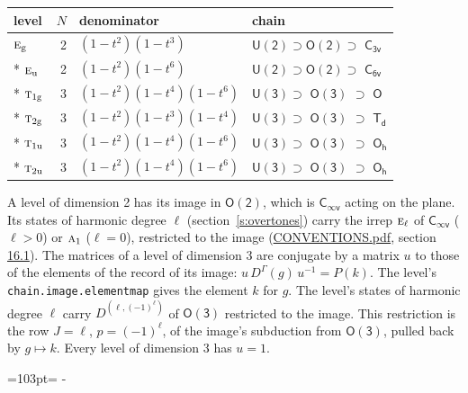 \documentclass[10pt,a4paper]{article}
\makeatletter
\def\grouprule#1#2{\noalign{\marks\LTgroupmarks{\the\belowrulesep}\nobreak\vskip#1%
  \vskip\aboverulesep}\multispan\LT@cols\unskip{\leaders\hrule\@height#2\hfill\kern\z@}\cr
  \noalign{\penalty\LTrulebreak\vskip\belowrulesep\global\@lastruleclass\z@}}
\newcommand{\needspace}[1]{\par\penalty-100\begingroup\dimen0=#1\relax\dimen2=\pagegoal
  \advance\dimen2-\pagetotal\ifdim\dimen0>\dimen2\relax\ifdim\dimen2>0pt\vfil\break\fi\fi
  \endgroup}
\numberwithin{equation}{section}
\newcommand{\grp}[1]{\mathsf{#1}}
\newcommand{\irr}[1]{\text{\normalfont\scshape #1}}
\newcommand{\ptag}[1]{\mathrm{#1}}
\newcommand{\irrJp}[2]{D^{(#1,#2)}}
\newcommand{\repD}[1]{D^{#1}}
\makeatother
\begin{document}
{\small\begin{longtable}{@{}lrll@{}}\toprule
level & $N$ & denominator & chain\\\midrule\endhead
\bottomrule\endfoot\endlastfoot
$\irr{e}_{\ptag{g}}$ & 2 & $(1-t^{2})(1-t^{3})$ & $\grp{U(2)} \supset \grp{O(2)} \supset$ \href{C3v.pdf}{$\grp{C_{3v}}$}\\*
$\irr{e}_{\ptag{u}}$ & 2 & $(1-t^{2})(1-t^{6})$ & $\grp{U(2)} \supset \grp{O(2)} \supset$ \href{C6v.pdf}{$\grp{C_{6v}}$}\\*
\grouprule{0pt}{\lightrulewidth}
$\irr{t}_{1\ptag{g}}$ & 3 & $(1-t^{2})(1-t^{4})(1-t^{6})$ & $\grp{U(3)} \supset$ \href{O3.pdf}{$\grp{O(3)}$} $\supset$ \href{O.pdf}{$\grp{O}$}\\*
$\irr{t}_{2\ptag{g}}$ & 3 & $(1-t^{2})(1-t^{3})(1-t^{4})$ & $\grp{U(3)} \supset$ \href{O3.pdf}{$\grp{O(3)}$} $\supset$ \href{Td.pdf}{$\grp{T_{d}}$}\\*
$\irr{t}_{1\ptag{u}}$ & 3 & $(1-t^{2})(1-t^{4})(1-t^{6})$ & $\grp{U(3)} \supset$ \href{O3.pdf}{$\grp{O(3)}$} $\supset$ \href{Oh.pdf}{$\grp{O_{h}}$}\\*
$\irr{t}_{2\ptag{u}}$ & 3 & $(1-t^{2})(1-t^{4})(1-t^{6})$ & $\grp{U(3)} \supset$ \href{O3.pdf}{$\grp{O(3)}$} $\supset$ \href{Oh.pdf}{$\grp{O_{h}}$}\\
\bottomrule\end{longtable}}
A level of dimension 2 has its image in $\grp{O(2)}$, which is \href{Cinfv.pdf}{$\grp{C_{\infty v}}$} acting on the plane. \label{n:index.harmonic.degree}Its states of harmonic degree $\ell$ (section~\ref{s:overtones}) carry the irrep $\irr{e}_{\ell}$ of \href{Cinfv.pdf}{$\grp{C_{\infty v}}$} ($\ell > 0$) or $\irr{a}_{1}$ ($\ell = 0$), restricted to the image (\href{../../CONVENTIONS.pdf}{CONVENTIONS.pdf}, section \href{../../CONVENTIONS.pdf\#conv.16.1}{16.1}).
\leavevmode\label{n:matrix.conjugator}The matrices of a level of dimension 3 are conjugate by a matrix $u$ to those of the elements of the record of its image: $u\,\repD{\Gamma}(g)\,u^{-1} = P(k)$. The level's \texttt{chain.image.elementmap} gives the element $k$ for $g$. The level's states of harmonic degree $\ell$ carry $\irrJp{\ell}{(-1)^{\ell}}$ of \href{O3.pdf}{$\grp{O(3)}$} restricted to the image. This restriction is the row $J = \ell$, $p = (-1)^{\ell}$, of the image's subduction from \href{O3.pdf}{$\grp{O(3)}$}, pulled back by $g \mapsto k$.
Every level of dimension 3 has $u = 1$.
\needspace{103pt}
\end{document}
